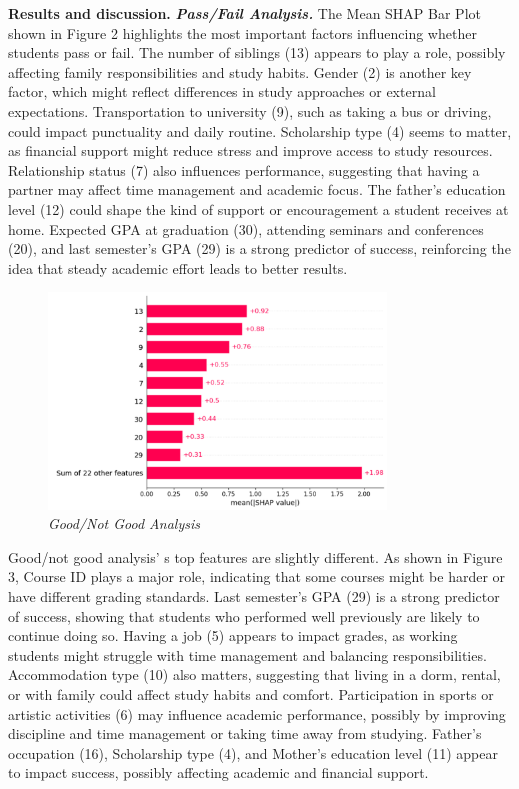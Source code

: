 \begin{multicols}{2}
{\bfseries Results and discussion.} \emph{{\bfseries Pass/Fail Analysis.}} The
Mean SHAP Bar Plot shown in Figure 2 highlights the most important
factors influencing whether students pass or fail. The number of
siblings (13) appears to play a role, possibly affecting family
responsibilities and study habits. Gender (2) is another key factor,
which might reflect differences in study approaches or external
expectations. Transportation to university (9), such as taking a bus or
driving, could impact punctuality and daily routine. Scholarship type
(4) seems to matter, as financial support might reduce stress and
improve access to study resources. Relationship status (7) also
influences performance, suggesting that having a partner may affect time
management and academic focus. The father's education level (12) could
shape the kind of support or encouragement a student receives at home.
Expected GPA at graduation (30), attending seminars and conferences
(20), and last semester's GPA (29) is a strong predictor of success,
reinforcing the idea that steady academic effort leads to better
results.
\end{multicols}

\begin{figure}[H]
	\centering
	\includegraphics[width=0.8\textwidth]{media/ict/image18}
	\caption*{Fig.2 - Mean SHAP Bar Plot (top pass/fail features)}
	\caption*{\emph{Good/Not Good Analysis}}
\end{figure}

\begin{multicols}{2}
Good/not good analysis' s top features are slightly
different. As shown in Figure 3, Course ID plays a major role,
indicating that some courses might be harder or have different grading
standards. Last semester's GPA (29) is a strong predictor of success,
showing that students who performed well previously are likely to
continue doing so. Having a job (5) appears to impact grades, as working
students might struggle with time management and balancing
responsibilities. Accommodation type (10) also matters, suggesting that
living in a dorm, rental, or with family could affect study habits and
comfort. Participation in sports or artistic activities (6) may
influence academic performance, possibly by improving discipline and
time management or taking time away from studying. Father's occupation
(16), Scholarship type (4), and Mother's education level (11) appear to
impact success, possibly affecting academic and financial support.
\end{multicols}

